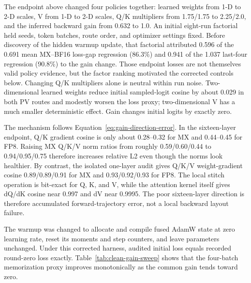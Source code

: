 The endpoint above changed four policies together: learned weights from 1-D
to 2-D scales, V from 1-D to 2-D scales, Q/K multipliers from 1.75/1.75 to
2.25/2.0, and the inferred backward gain from 0.632 to 1.0.  An initial
eight-run factorial held seeds, token batches, route order, and optimizer
settings fixed.  Before discovery of the hidden warmup update, that factorial
attributed 0.596 of the 0.691 mean MX--BF16 loss-gap regression (86.3\%) and
0.941 of the 1.037 last-four regression (90.8\%) to the gain change.  Those
endpoint losses are not themselves valid policy evidence, but the factor
ranking motivated the corrected controls below.  Changing Q/K multipliers
alone is neutral within run noise.  Two-dimensional learned weights reduce
initial sampled-logit cosine by about 0.029 in both PV routes and modestly
worsen the loss proxy; two-dimensional V has a much smaller deterministic
effect.  Gain changes initial logits by exactly zero.

The mechanism follows Equation~\ref{eq:gain-direction-error}.  In the
sixteen-layer endpoint, Q/K gradient cosine is only about 0.28--0.32 for MX
and 0.44--0.45 for FP8.  Raising MX Q/K/V norm ratios from roughly
0.59/0.60/0.44 to 0.94/0.95/0.75 therefore increases relative L2 even though
the norms look healthier.  By contrast, the isolated one-layer audit gives
Q/K/V weight-gradient cosine 0.89/0.89/0.91 for MX and
0.93/0.92/0.93 for FP8.  The local stitch operation is bit-exact for Q, K,
and V, while the attention kernel itself gives dQ/dK cosine near 0.997 and dV
near 0.9995.  The poor sixteen-layer direction is therefore accumulated
forward-trajectory error, not a local backward layout failure.

The warmup was changed to allocate and compile fused AdamW state at zero
learning rate, reset its moments and step counters, and leave parameters
unchanged.  Under this corrected harness, audited initial loss equals recorded
round-zero loss exactly.  Table~\ref{tab:clean-gain-sweep} shows that the
four-batch memorization proxy improves monotonically as the common gain tends
toward zero.

